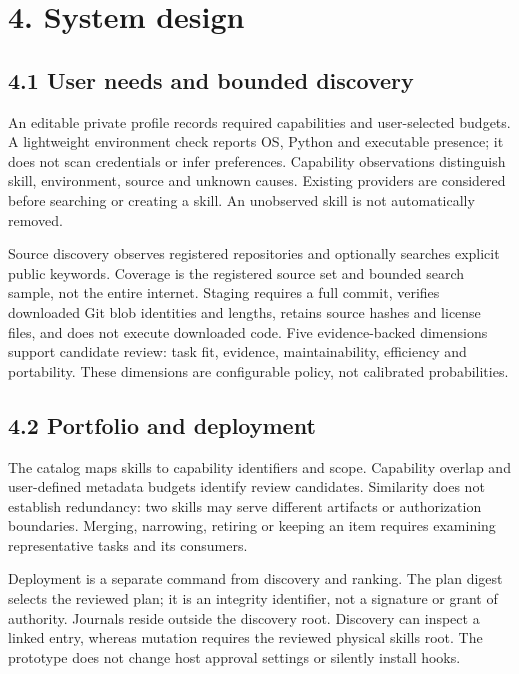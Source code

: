 \documentclass[
  11pt,
]{article}
\begin{document}
\section{4. System design}\label{system-design}

\subsection{4.1 User needs and bounded
discovery}\label{user-needs-and-bounded-discovery}

An editable private profile records required capabilities and
user-selected budgets. A lightweight environment check reports OS,
Python and executable presence; it does not scan credentials or infer
preferences. Capability observations distinguish skill, environment,
source and unknown causes. Existing providers are considered before
searching or creating a skill. An unobserved skill is not automatically
removed.

Source discovery observes registered repositories and optionally
searches explicit public keywords. Coverage is the registered source set
and bounded search sample, not the entire internet. Staging requires a
full commit, verifies downloaded Git blob identities and lengths,
retains source hashes and license files, and does not execute downloaded
code. Five evidence-backed dimensions support candidate review: task
fit, evidence, maintainability, efficiency and portability. These
dimensions are configurable policy, not calibrated probabilities.

\subsection{4.2 Portfolio and
deployment}\label{portfolio-and-deployment}

The catalog maps skills to capability identifiers and scope. Capability
overlap and user-defined metadata budgets identify review candidates.
Similarity does not establish redundancy: two skills may serve different
artifacts or authorization boundaries. Merging, narrowing, retiring or
keeping an item requires examining representative tasks and its
consumers.

Deployment is a separate command from discovery and ranking. The plan
digest selects the reviewed plan; it is an integrity identifier, not a
signature or grant of authority. Journals reside outside the discovery
root. Discovery can inspect a linked entry, whereas mutation requires
the reviewed physical skills root. The prototype does not change host
approval settings or silently install hooks.
\end{document}

